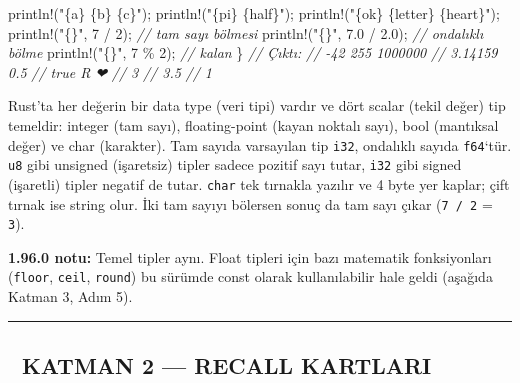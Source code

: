 \documentclass[12pt,a4paper]{article}
\newenvironment{Shaded}{}{}
\newcommand{\CommentTok}[1]{\textcolor[rgb]{0.38,0.63,0.69}{\textit{#1}}}
\newcommand{\DecValTok}[1]{\textcolor[rgb]{0.25,0.63,0.44}{#1}}
\newcommand{\FloatTok}[1]{\textcolor[rgb]{0.25,0.63,0.44}{#1}}
\newcommand{\NormalTok}[1]{#1}
\newcommand{\OperatorTok}[1]{\textcolor[rgb]{0.40,0.40,0.40}{#1}}
\newcommand{\StringTok}[1]{\textcolor[rgb]{0.25,0.44,0.63}{#1}}
\begin{document}
\begin{Shaded}
\begin{Highlighting}[]
\NormalTok{    println}\OperatorTok{!(}\StringTok{"\{a\} \{b\} \{c\}"}\OperatorTok{);}
\NormalTok{    println}\OperatorTok{!(}\StringTok{"\{pi\} \{half\}"}\OperatorTok{);}
\NormalTok{    println}\OperatorTok{!(}\StringTok{"\{ok\} \{letter\} \{heart\}"}\OperatorTok{);}
\NormalTok{    println}\OperatorTok{!(}\StringTok{"\{\}"}\OperatorTok{,} \DecValTok{7} \OperatorTok{/} \DecValTok{2}\OperatorTok{);}      \CommentTok{// tam sayı bölmesi}
\NormalTok{    println}\OperatorTok{!(}\StringTok{"\{\}"}\OperatorTok{,} \FloatTok{7.0} \OperatorTok{/} \FloatTok{2.0}\OperatorTok{);}  \CommentTok{// ondalıklı bölme}
\NormalTok{    println}\OperatorTok{!(}\StringTok{"\{\}"}\OperatorTok{,} \DecValTok{7} \OperatorTok{\%} \DecValTok{2}\OperatorTok{);}      \CommentTok{// kalan}
\OperatorTok{\}}
\CommentTok{// Çıktı:}
\CommentTok{// -42 255 1000000}
\CommentTok{// 3.14159 0.5}
\CommentTok{// true R ❤}
\CommentTok{// 3}
\CommentTok{// 3.5}
\CommentTok{// 1}
\end{Highlighting}
\end{Shaded}

Rust'ta her değerin bir data type (veri tipi) vardır ve dört scalar (tekil değer) tip temeldir: integer (tam sayı), floating-point (kayan noktalı sayı), bool (mantıksal değer) ve char (karakter). Tam sayıda varsayılan tip \texttt{i32}, ondalıklı sayıda \texttt{f64}`tür. \texttt{u8} gibi unsigned (işaretsiz) tipler sadece pozitif sayı tutar, \texttt{i32} gibi signed (işaretli) tipler negatif de tutar. \texttt{char} tek tırnakla yazılır ve 4 byte yer kaplar; çift tırnak ise string olur. İki tam sayıyı bölersen sonuç da tam sayı çıkar (\texttt{7\ /\ 2} = \texttt{3}).

\textbf{1.96.0 notu:} Temel tipler aynı. Float tipleri için bazı matematik fonksiyonları (\texttt{floor}, \texttt{ceil}, \texttt{round}) bu sürümde const olarak kullanılabilir hale geldi (aşağıda Katman 3, Adım 5).

\begin{center}\rule{0.5\linewidth}{0.5pt}\end{center}

\subsection{🔵 KATMAN 2 --- RECALL KARTLARI}\label{katman-2-—-recall-kartlari-3}
\end{document}
